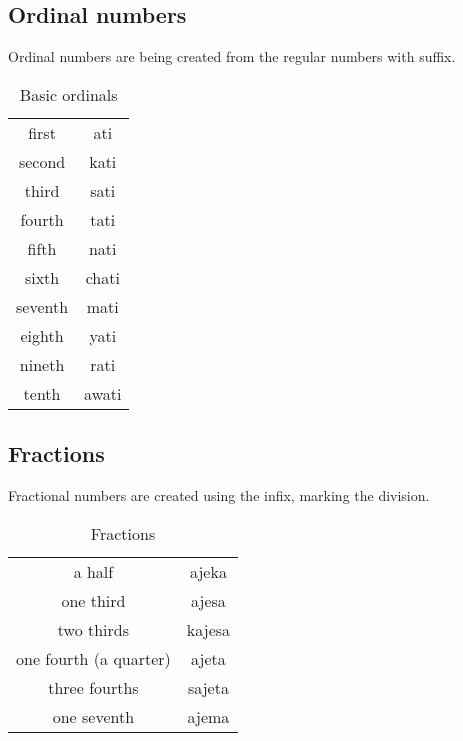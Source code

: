 \subsection{Ordinal numbers}

Ordinal numbers are being created from the regular numbers with  suffix.

\begin{table}[ht]
    \centering
    \caption{Basic ordinals}
    \begin{tabular}{cc} \toprule
        first   & ati   \\
        second  & kati  \\
        third   & sati  \\
        fourth  & tati  \\
        fifth   & nati  \\
        sixth   & chati \\
        seventh & mati  \\
        eighth  & yati  \\
        nineth  & rati  \\
        tenth   & awati \\\bottomrule
    \end{tabular}
    \label{tab:numerals3}
\end{table}

\subsection{Fractions}

Fractional numbers are created using the  infix, marking the division.


\begin{table}[ht]
    \centering
    \caption{Fractions}
    \begin{tabular}{cc} \toprule
        a half                 & ajeka  \\
        one third              & ajesa  \\
        two thirds             & kajesa \\
        one fourth (a quarter) & ajeta  \\
        three fourths          & sajeta \\
        one seventh            & ajema  \\\bottomrule
    \end{tabular}
    \label{tab:numerals4}
\end{table}

